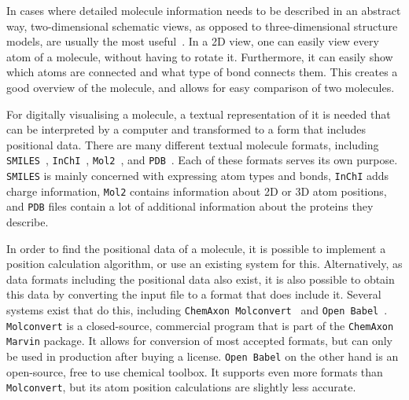 In cases where detailed molecule information needs to be described in an abstract way, two-dimensional schematic views, as opposed to three-dimensional structure models, are usually the most useful~\cite{zhou2009molecular}. In a 2D view, one can easily view every atom of a molecule, without having to rotate it. Furthermore, it can easily show which atoms are connected and what type of bond connects them. This creates a good overview of the molecule, and allows for easy comparison of two molecules.

For digitally visualising a molecule, a textual representation of it is needed that can be interpreted by a computer and transformed to a form that includes positional data. There are many different textual molecule formats, including \verb|SMILES|~\cite{daylight1992daylight}, \verb|InChI|~\cite{heller2013inchi}, \verb|Mol2|~\cite{tripos2005tripos}, and \verb|PDB|~\cite{bernstein1977protein}. Each of these formats serves its own purpose. \verb|SMILES| is mainly concerned with expressing atom types and bonds, \verb|InChI| adds charge information, \verb|Mol2| contains information about 2D or 3D atom positions, and \verb|PDB| files contain a lot of additional information about the proteins they describe.


In order to find the positional data of a molecule, it is possible to implement a position calculation algorithm, or use an existing system for this. Alternatively, as data formats including the positional data also exist, it is also possible to obtain this data by converting the input file to a format that does include it. Several systems exist that do this, including \verb|ChemAxon Molconvert|~\cite{chemaxon2014molecule} and \verb|Open Babel|~\cite{oboyle2011open}. \verb|Molconvert| is a closed-source, commercial program that is part of the \verb|ChemAxon Marvin| package. It allows for conversion of most accepted formats, but can only be used in production after buying a license. \verb|Open Babel| on the other hand is an open-source, free to use chemical toolbox. It supports even more formats than \verb|Molconvert|, but its atom position calculations are slightly less accurate.

